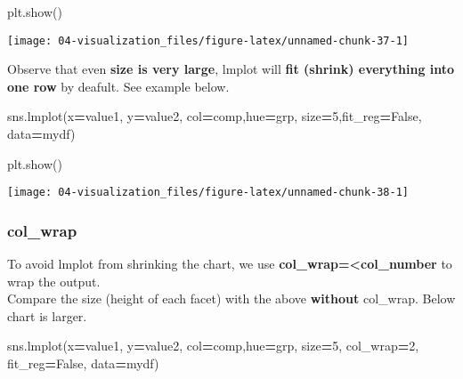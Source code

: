 \documentclass[
]{book}
\newenvironment{Shaded}{\begin{snugshade}}{\end{snugshade}}
\newcommand{\DecValTok}[1]{\textcolor[rgb]{0.06,0.06,0.06}{#1}}
\newcommand{\NormalTok}[1]{#1}
\newcommand{\OperatorTok}[1]{\textcolor[rgb]{0.43,0.43,0.43}{\textbf{#1}}}
\newcommand{\StringTok}[1]{\textcolor[rgb]{0.5,0.5,0.5}{#1}}
\newcommand{\VariableTok}[1]{\textcolor[rgb]{0,0,0}{#1}}
\begin{document}
\begin{Shaded}
\begin{Highlighting}[]
\NormalTok{plt.show()}
\end{Highlighting}
\end{Shaded}

\texttt{[image: 04-visualization\_files/figure-latex/unnamed-chunk-37-1]}

Observe that even \textbf{size is very large}, lmplot will \textbf{fit (shrink) everything into one row} by deafult. See example below.

\begin{Shaded}
\begin{Highlighting}[]
\NormalTok{sns.lmplot(x}\OperatorTok{=}\StringTok{\textquotesingle{}value1\textquotesingle{}}\NormalTok{, y}\OperatorTok{=}\StringTok{\textquotesingle{}value2\textquotesingle{}}\NormalTok{, col}\OperatorTok{=}\StringTok{\textquotesingle{}comp\textquotesingle{}}\NormalTok{,hue}\OperatorTok{=}\StringTok{\textquotesingle{}grp\textquotesingle{}}\NormalTok{, size}\OperatorTok{=}\DecValTok{5}\NormalTok{,fit\_reg}\OperatorTok{=}\VariableTok{False}\NormalTok{, data}\OperatorTok{=}\NormalTok{mydf)}
\end{Highlighting}
\end{Shaded}

\begin{Shaded}
\begin{Highlighting}[]
\NormalTok{plt.show()}
\end{Highlighting}
\end{Shaded}

\texttt{[image: 04-visualization\_files/figure-latex/unnamed-chunk-38-1]}

\hypertarget{col_wrap}{%
\subsubsection{col\_wrap}\label{col_wrap}}

To avoid lmplot from shrinking the chart, we use \textbf{col\_wrap=\textless col\_number} to wrap the output.\\
Compare the size (height of each facet) with the above \textbf{without} col\_wrap. Below chart is larger.

\begin{Shaded}
\begin{Highlighting}[]
\NormalTok{sns.lmplot(x}\OperatorTok{=}\StringTok{\textquotesingle{}value1\textquotesingle{}}\NormalTok{, y}\OperatorTok{=}\StringTok{\textquotesingle{}value2\textquotesingle{}}\NormalTok{, col}\OperatorTok{=}\StringTok{\textquotesingle{}comp\textquotesingle{}}\NormalTok{,hue}\OperatorTok{=}\StringTok{\textquotesingle{}grp\textquotesingle{}}\NormalTok{, size}\OperatorTok{=}\DecValTok{5}\NormalTok{, col\_wrap}\OperatorTok{=}\DecValTok{2}\NormalTok{, fit\_reg}\OperatorTok{=}\VariableTok{False}\NormalTok{, data}\OperatorTok{=}\NormalTok{mydf)}
\end{Highlighting}
\end{Shaded}
\end{document}
